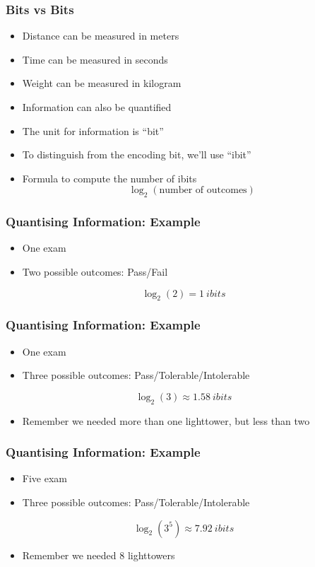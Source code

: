 \documentclass{../ucll-slides}
\begin{document}
\begin{frame}
  \frametitle{Bits vs Bits}
  \begin{itemize}
    \item Distance can be measured in meters
    \item Time can be measured in seconds
    \item Weight can be measured in kilogram
    \item Information can also be quantified
    \item The unit for information is ``bit''
    \item To distinguish from the encoding bit, we'll use ``ibit''
    \item Formula to compute the number of ibits
          \[
            \log_2(\textrm{number of outcomes})
          \]
  \end{itemize}
\end{frame}

\begin{frame}
  \frametitle{Quantising Information: Example}
  \begin{itemize}
    \item One exam
    \item Two possible outcomes: Pass/Fail
  \end{itemize}
  \vskip5mm
  \[
    \log_2(2) = \SI{1}{ibits}
  \]
\end{frame}

\begin{frame}
  \frametitle{Quantising Information: Example}
  \begin{itemize}
    \item One exam
    \item Three possible outcomes: Pass/Tolerable/Intolerable
  \end{itemize}
  \vskip5mm
  \[
    \log_2(3) \approx \SI{1.58}{ibits}
  \]
  \vskip5mm
  \begin{itemize}
    \item Remember we needed more than one lighttower, but less than two
  \end{itemize}
\end{frame}

\begin{frame}
  \frametitle{Quantising Information: Example}
  \begin{itemize}
    \item Five exam
    \item Three possible outcomes: Pass/Tolerable/Intolerable
  \end{itemize}
  \vskip5mm
  \[
    \log_2(3^5) \approx \SI{7.92}{ibits}
  \]
  \vskip5mm
  \begin{itemize}
    \item Remember we needed 8 lighttowers
  \end{itemize}
\end{frame}
\end{document}
